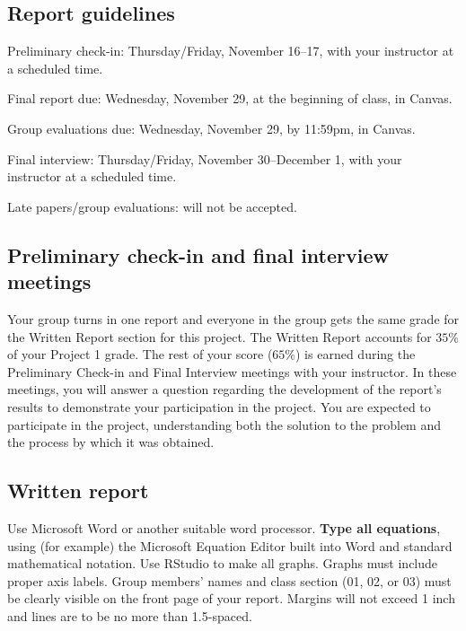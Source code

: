 \documentclass{article}
\begin{document}

\subsection*{Report guidelines}
\vspace{-2.8ex}


\begin{compactdesc}
    \item[Preliminary check-in:] Thursday/Friday, November 16--17, with your
    instructor at a scheduled time.
    \item[Final report due:] Wednesday, November 29, at the beginning of
    class, in Canvas.
    \item[Group evaluations due:] Wednesday, November 29, by 11:59pm, in
    Canvas.
    \item[Final interview:] Thursday/Friday, November 30--December 1, with your
    instructor at a scheduled time.
    \item[Late papers/group evaluations:] will not be accepted.
\end{compactdesc}

\subsection*{Preliminary check-in and final interview meetings}
\vspace{-2.8ex}

Your group turns in one report and everyone in the group gets the same grade
for the Written Report section for this project. The Written Report accounts
for $35\%$ of your Project 1 grade.  The rest of your score ($65\%$) is earned
during the Preliminary Check-in and Final Interview meetings with your
instructor. In these meetings, you will answer a question regarding the
development of the report's results to demonstrate your participation in the
project.  You are expected to participate in the project, understanding both
the solution to the problem and the process by which it was obtained.

\subsection*{Written report}
\vspace{-2.8ex}

Use Microsoft Word or another suitable word processor. \textbf{Type all equations},
using (for example) the Microsoft Equation Editor built into Word and standard
mathematical notation. Use RStudio to make all graphs. Graphs must include
proper axis labels. Group members' names and class section (01, 02, or 03)
must be clearly visible on the front page of your report. Margins will not
exceed 1 inch and lines are to be no more than 1.5-spaced.
\end{document}
